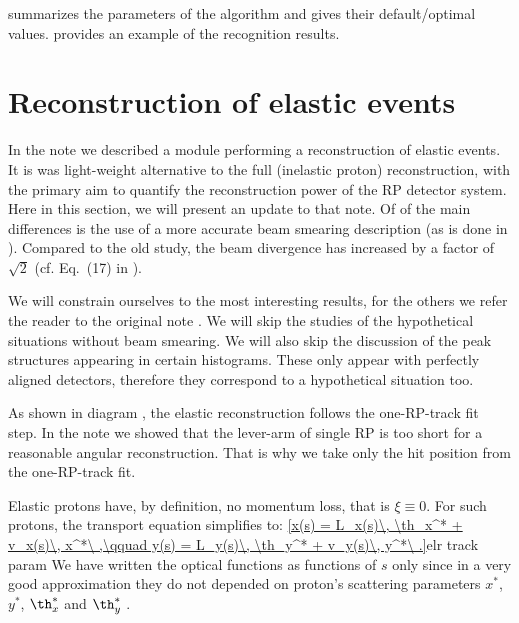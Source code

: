  summarizes the parameters of the algorithm and gives their default/optimal values.  provides an example of the recognition results.



\section[elr]{Reconstruction of elastic events}

In the note  we described a module performing a reconstruction of elastic events. It is was light-weight alternative to the full (inelastic proton) reconstruction, with the primary aim to quantify the reconstruction power of the RP detector system. Here in this section, we will present an update to that note. Of of the main differences is the use of a more accurate beam smearing description (as is done in ). Compared to the old study, the beam divergence has increased by a factor of $\sqrt 2$ (cf. Eq.~(17) in ).

We will constrain ourselves to the most interesting results, for the others we refer the reader to the original note . We will skip the studies of the hypothetical situations without beam smearing. We will also skip the discussion of the peak structures appearing in certain histograms. These only appear with perfectly aligned detectors, therefore they correspond to a hypothetical situation too.

As shown in diagram , the elastic reconstruction follows the one-RP-track fit step. In the note  we showed that the lever-arm of single RP is too short for a reasonable angular reconstruction. That is why we take only the hit position from the one-RP-track fit.

Elastic protons have, by definition, no momentum loss, that is $\xi \equiv 0$. For such protons, the transport equation  simplifies to:
\eqref{x(s) = L_x(s)\, \th_x^* + v_x(s)\, x^*\ ,\qquad y(s) = L_y(s)\, \th_y^* + v_y(s)\, y^*\ .}{elr track param}
We have written the optical functions as functions of $s$ only since in a very good approximation they do not depended on proton's scattering parameters $x^*$, $y^*$, $\th^*_x$ and $\th^*_y$ . 

